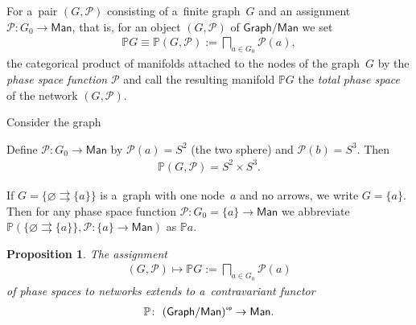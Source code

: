 \documentclass[pdftex]{sigma}
\numberwithin{equation}{section}
\newtheorem{Proposition}[Theorem]{Proposition}
{ \theoremstyle{definition}
\newtheorem{Definition}[Theorem]{Definition}
\newtheorem{Notation}[Theorem]{Notation}
\newtheorem{Example}[Theorem]{Example}
\newtheorem{Remark}[Theorem]{Remark} }
\newcommand{\op}[1]{{#1}^{\mbox{\sf{\tiny{op}}}}}
\begin{document}
\begin{Definition} For a~pair $(G,{\mathcal P})$ consisting of a~f\/inite graph~$G$ and
an assignment ${\mathcal P}\colon G_0\to \mathsf{Man}$, that is, for an object $(G,{\mathcal P})$ of
$\mathsf{Graph}/\mathsf{Man}$ we set
\begin{gather*}
\mathbb{P} G\equiv \mathbb{P} (G,{\mathcal P}):= \bigsqcap_{a\in G_0} {\mathcal P} (a),
\end{gather*}
the categorical product of manifolds attached to the nodes of the graph~$G$ by the {\it phase space function} ${\mathcal
P}$ and call the resulting manifold $\mathbb{P} G$ the {\it total phase space} of the network $(G,{\mathcal P})$.
\end{Definition}

\begin{Example}
\label{example:1}
Consider the graph


Def\/ine ${\mathcal P}\colon G_0\to \mathsf{Man}$ by ${\mathcal P}(a) = S^2$ (the two sphere) and ${\mathcal P}(b) = S^3$.
Then
\begin{gather*}
\mathbb{P} (G, {\mathcal P}) = S^2 \times S^3.
\end{gather*}
\end{Example}

\begin{Notation}
\label{notation:2.11}
If $G=\{\varnothing \rightrightarrows \{a\}\}$ is a~graph with one node~$a$ and no arrows, we write $G=\{a\}$.
Then for any phase space function ${\mathcal P}\colon G_0 =\{a\} \to \mathsf{Man}$ we abbreviate $\mathbb{P}
(\{\varnothing \rightrightarrows \{a\} \}, {\mathcal P}\colon \{a\} \to \mathsf{Man})$ as $\mathbb{P} a$.
\end{Notation}

\begin{Proposition}
\label{prop2.13}
The assignment
\begin{gather*}
(G,{\mathcal P}) \mapsto \mathbb{P} G:= \bigsqcap_{a\in G_0} {\mathcal P} (a)
\end{gather*}
of phase spaces to networks extends to a~contravariant functor
\begin{gather*}
\mathbb{P} \colon \ \op{(\mathsf{Graph}/\mathsf{Man})} \to \mathsf{Man}.
\end{gather*}
\end{Proposition}
\end{document}
